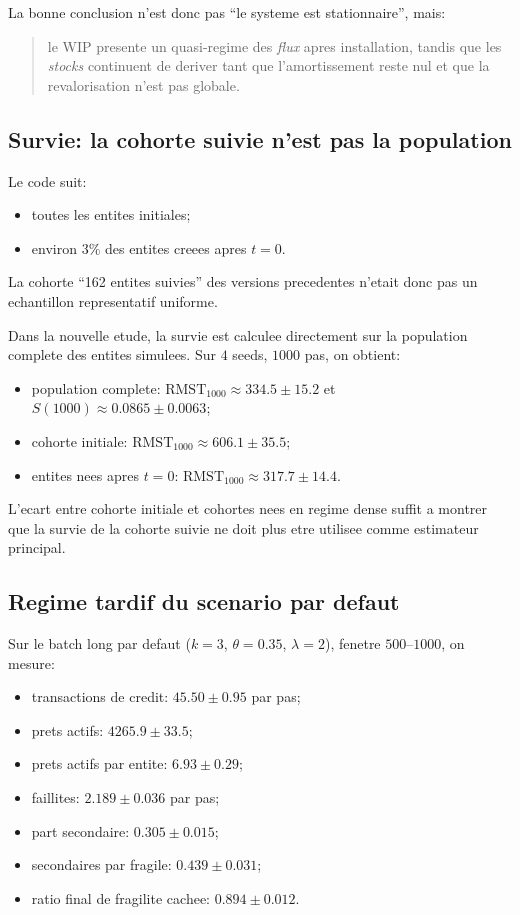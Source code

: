 \documentclass[11pt,a4paper]{article}
\begin{document}
La bonne conclusion n'est donc pas ``le systeme est stationnaire'', mais:
\begin{quote}
le WIP presente un quasi-regime des \emph{flux} apres installation, tandis que les \emph{stocks} continuent de deriver tant que l'amortissement reste nul et que la revalorisation n'est pas globale.
\end{quote}

\subsection{Survie: la cohorte suivie n'est pas la population}
Le code suit:
\begin{itemize}
\item toutes les entites initiales;
\item environ $3\%$ des entites creees apres $t=0$.
\end{itemize}
La cohorte ``162 entites suivies'' des versions precedentes n'etait donc pas un echantillon representatif uniforme.

Dans la nouvelle etude, la survie est calculee directement sur la population complete des entites simulees. Sur $4$ seeds, $1000$ pas, on obtient:
\begin{itemize}
\item population complete: $\mathrm{RMST}_{1000}\approx 334.5 \pm 15.2$ et $S(1000)\approx 0.0865 \pm 0.0063$;
\item cohorte initiale: $\mathrm{RMST}_{1000}\approx 606.1 \pm 35.5$;
\item entites nees apres $t=0$: $\mathrm{RMST}_{1000}\approx 317.7 \pm 14.4$.
\end{itemize}
L'ecart entre cohorte initiale et cohortes nees en regime dense suffit a montrer que la survie de la cohorte suivie ne doit plus etre utilisee comme estimateur principal.

\subsection{Regime tardif du scenario par defaut}
Sur le batch long par defaut ($k=3$, $\theta=0.35$, $\lambda=2$), fenetre $500$--$1000$, on mesure:
\begin{itemize}
\item transactions de credit: $45.50 \pm 0.95$ par pas;
\item prets actifs: $4265.9 \pm 33.5$;
\item prets actifs par entite: $6.93 \pm 0.29$;
\item faillites: $2.189 \pm 0.036$ par pas;
\item part secondaire: $0.305 \pm 0.015$;
\item secondaires par fragile: $0.439 \pm 0.031$;
\item ratio final de fragilite cachee: $0.894 \pm 0.012$.
\end{itemize}
\end{document}
